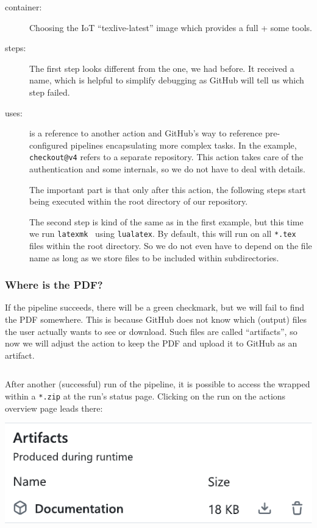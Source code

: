 \documentclass[final]{ltugboat}
\newcommand*{\TeXLive}{\acro{\TeX\,Live}\xspace}
\newcommand*{\action}[1]{\texttt{#1}}
\newcommand*{\command}[1]{\texttt{#1}}
\newcommand*{\file}[1]{\texttt{#1}}
\newcommand*{\containerimage}[1]{\enquote{#1}}
\begin{document}
\begin{description}
\item[container:] Choosing the IoT \containerimage{texlive-latest} image which provides a full \TeXLive{} + some tools\cite{islandoftex-docker}.
\item[steps:]
The first step looks different from the one, we had before.
It received a name, which is helpful to simplify debugging as GitHub will tell us which step failed.

\item[uses:] is a reference to another action and GitHub's way to reference pre-configured pipelines encapsulating more complex tasks.
In the example, \action{checkout@v4} refers to a separate repository\cite{github-action-checkout}.
This action takes care of the authentication and some internals, so we do not have to deal with details.

The important part is that only after this action, the following steps start being executed within the root directory of our repository.

The second step is kind of the same as in the first example, but this time we run \command{latexmk}~\cite{latexmk} using \command{lualatex}.
By default, this will run on all \file{*.tex} files within the root directory.
So we do not even have to depend on the file name as long as we store files to be included within subdirectories.
\end{description}

\subsubsection{Where is the PDF?}
If the pipeline succeeds, there will be a green checkmark, but we will fail to find the PDF somewhere.
This is because GitHub does not know which (output) files the user actually wants to see or download.
Such files are called \enquote{artifacts}, so now we will adjust the action to keep the PDF and upload it to GitHub as an artifact.

\inputminted[firstline=13, lastline=17,gobble=3]{yaml}{examples/latex-basic.yml}

After another (successful) run of the pipeline, it is possible to access the  wrapped within a \file{*.zip} at the run's status page.
Clicking on the run on the actions overview page leads there:

\noindent\includegraphics[width=\linewidth,alt={Cropping of a screenshot. It shows the GitHub artifacts download section. A Packaged artifact called “Documentation” is available.}]{screenshot-artifacts}
\end{document}
